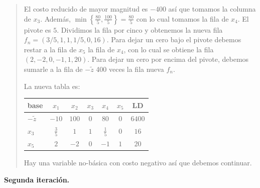 \documentclass[12pt]{article}
\begin{document}
\small
\begin{quote}

El costo reducido de mayor magnitud es $-400$ así que tomamos la columna de
$x_3$. Además, $\min \left\{ \frac{80}{5}, \frac{100}{5} \right\} =
\frac{80}{5}$ con lo cual tomamos la fila de $x_4$. El pivote es $5$. Dividimos
la fila por cinco y obtenemos la nueva fila $f_n = (3 / 5, 1, 1, 1 / 5, 0, 16)$. Para
dejar un cero bajo el pivote debemos restar a la fila de $x_5$ la fila de $x_4$,
con lo cual se obtiene la fila $(2, -2, 0, -1, 1, 20)$. Para dejar un cero por
encima del pivote, debemos sumarle a la fila de $-\widetilde{ z } $ 400 veces la
fila nueva $f_n$.

La nueva tabla es:

\begin{table}[h]

\centering

\begin{tabular}{lccccc|c}

\toprule

base & $x_1$ & $x_2$ & $x_3$ & $x_4$ & $x_5$ &  LD \\

\midrule

$-\widetilde{ z } $  & $-10$ & $100$ & $0$ & $80$ & $0$  & $6400$ \\
\midrule
$x_3$ & $\frac{3}{5}$ & $1$  & $1$ & $\frac{1}{5}$  & $0$ & $16$ \\

$x_5$ & $2$ & $-2$  & $0$ & $-1$ & $1$ & $20$ \\

\bottomrule

\end{tabular}

\end{table}

Hay una variable no-básica con costo negativo así que debemos continuar.
\end{quote}
\normalsize

\textbf{Segunda iteración.}
\end{document}
